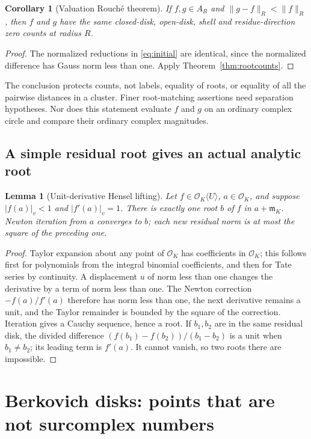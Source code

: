\documentclass[11pt,a4paper]{article}
\numberwithin{equation}{section}
\newtheorem{lemma}[theorem]{Lemma}
\newtheorem{corollary}[theorem]{Corollary}
\theoremstyle{definition}
\theoremstyle{remark}
\newcommand{\OO}{\mathcal O}
\newcommand{\mm}{\mathfrak m}
\newcommand{\vabs}[1]{\lvert#1\rvert_v}
\newcommand{\Gauss}[2]{\lVert#1\rVert_{#2}}
\begin{document}
\begin{corollary}[Valuation Rouch\'e theorem]\label{cor:rouche}
If $f,g\in A_R$ and $\Gauss{g-f}R<\Gauss fR$, then $f$ and $g$ have the same
closed-disk, open-disk, shell and residue-direction zero counts at radius $R$.
\end{corollary}
\begin{proof}
The normalized reductions in \eqref{eq:initial} are identical, since the
normalized difference has Gauss norm less than one. Apply
Theorem~\ref{thm:rootcounts}.
\end{proof}

The conclusion protects counts, not labels, equality of roots, or equality of
all the pairwise distances in a cluster. Finer root-matching assertions need
separation hypotheses. Nor does this statement evaluate $f$ and $g$ on an
ordinary complex circle and compare their ordinary complex magnitudes.

\subsection{A simple residual root gives an actual analytic root}
\begin{lemma}[Unit-derivative Hensel lifting]\label{lem:hensel}
Let $f\in\OO_K\langle U\rangle$, $a\in\OO_K$, and suppose
$\vabs{f(a)}<1$ and $\vabs{f'(a)}=1$. There is exactly one root $b$ of $f$ in
$a+\mm_K$. Newton iteration from $a$ converges to $b$; each new residual norm is at most the square of the preceding one.
\end{lemma}
\begin{proof}
Taylor expansion about any point of $\OO_K$ has coefficients in $\OO_K$;
this follows first for polynomials from the integral binomial coefficients,
and then for Tate series by continuity. A displacement $u$ of norm less than
one changes the derivative by a term of norm less than one. The Newton
correction $-f(a)/f'(a)$ therefore has norm less than one, the next derivative
remains a unit, and the Taylor remainder is bounded by the square of the
correction. Iteration gives a Cauchy sequence, hence a root. If $b_1,b_2$ are
in the same residual disk, the divided difference
$(f(b_1)-f(b_2))/(b_1-b_2)$ is a unit when $b_1\ne b_2$; its leading term is
$f'(a)$. It cannot vanish, so two roots there are impossible.
\end{proof}

\section{Berkovich disks: points that are not surcomplex numbers}
\label{sec:berkovich}
\end{document}
